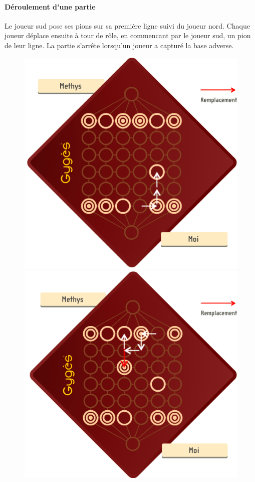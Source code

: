 	\paragraph{Déroulement d'une partie} Le joueur sud pose ses pions sur sa première ligne
	suivi du joueur nord. Chaque joueur déplace ensuite à tour de rôle, en commencant par le
	joueur sud, un pion de leur ligne. La partie s'arrête lorsqu'un joueur a capturé la base
	adverse.

	\begin{figure}[h!]
		\centering
		\begin{minipage}[b]{0.4\linewidth}
		\centering
		\includegraphics[width=\textwidth]{images/ex1.png}
		\end{minipage}
		\hspace{0.5cm}
		\begin{minipage}[b]{0.4\linewidth}
		\centering
		\includegraphics[width=\textwidth]{images/ex2.png}

\end{minipage}
\end{figure}
